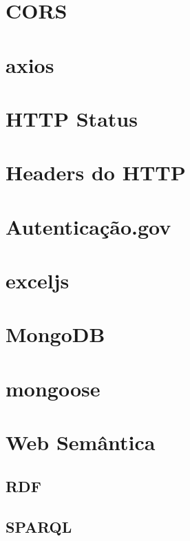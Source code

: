 \section{CORS}

\section{axios}

\section{HTTP Status}

\section{Headers do HTTP}

\section{Autenticação.gov}
\cite{agov}

\section{exceljs}

\section{MongoDB}
\cite{wdmongo}

\section{mongoose}

\section{Web Semântica}
\cite{lsparql}

\subsection{RDF}
\cite{lsparql}

\subsection{SPARQL}
\cite{lsparql}

